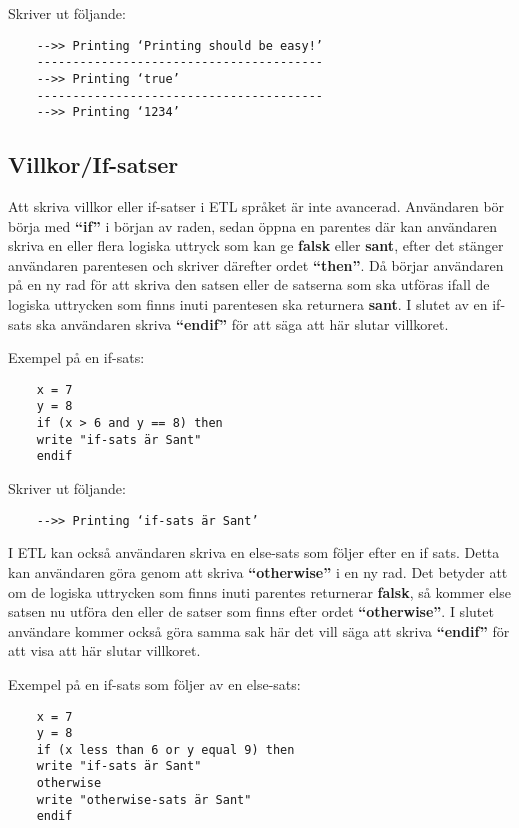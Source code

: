 \documentclass{TDP019mall}
\begin{document}
Skriver ut följande:

\begin{verbatim}
    -->> Printing ‘Printing should be easy!’
    ----------------------------------------
    -->> Printing ‘true’
    ----------------------------------------
    -->> Printing ‘1234’   
\end{verbatim} 


\subsection{Villkor/If-satser}
Att skriva villkor eller if-satser i ETL språket är inte avancerad. Användaren bör börja med \textbf{“if”} i början av raden, 
sedan öppna en parentes där kan användaren skriva en eller flera logiska uttryck som kan ge \textbf{falsk} eller \textbf{sant}, efter det stänger 
användaren parentesen och skriver därefter ordet \textbf{“then”}. Då börjar användaren på en ny rad för att skriva den satsen eller de satserna 
som ska utföras ifall de logiska uttrycken som finns inuti parentesen ska returnera \textbf{sant}. I slutet av en if-sats ska 
användaren skriva \textbf{“endif”} för att säga att här slutar villkoret.
 
Exempel på en if-sats: 
 
\begin{verbatim}
    x = 7
    y = 8
    if (x > 6 and y == 8) then
    write "if-sats är Sant"
    endif
\end{verbatim}

Skriver ut följande:
\begin{verbatim}
    -->> Printing ‘if-sats är Sant’
\end{verbatim}

\newpage
I ETL kan också användaren skriva en else-sats som följer efter en if sats. Detta kan användaren göra genom att skriva \textbf{“otherwise”} i 
en ny rad. Det betyder att om de logiska uttrycken som finns inuti parentes returnerar \textbf{falsk}, så kommer else satsen nu utföra den eller 
de satser som finns efter ordet \textbf{“otherwise”}. I slutet användare kommer också göra samma sak här det vill säga att skriva \textbf{“endif”} 
för att visa att här slutar villkoret.
 
Exempel på en if-sats som följer av en else-sats: 
\begin{verbatim}
    x = 7
    y = 8
    if (x less than 6 or y equal 9) then
    write "if-sats är Sant"
    otherwise
    write "otherwise-sats är Sant"
    endif
\end{verbatim} 
\end{document}

